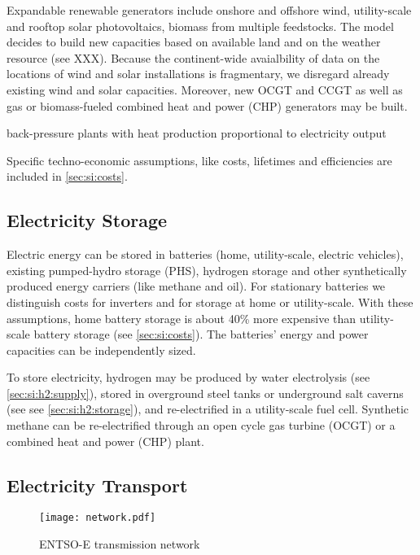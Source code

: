 Expandable renewable generators include onshore and offshore wind, utility-scale
and rooftop solar photovoltaics, biomass from multiple feedstocks. The model
decides to build new capacities based on available land and on the weather
resource (see XXX). Because the continent-wide avaialbility of data on the
locations of wind and solar installations is fragmentary, we disregard already
existing wind and solar capacities. Moreover, new OCGT and CCGT as well as gas or biomass-fueled combined heat and power (CHP) generators may be built.

back-pressure plants with heat production proportional to electricity output

Specific techno-economic assumptions, like costs, lifetimes and efficiencies are
included in \cref{sec:si:costs}.

\subsection{Electricity Storage}
\label{sec:si:electricity:storage}

Electric energy can be stored in batteries (home, utility-scale, electric
vehicles), existing pumped-hydro storage (PHS), hydrogen storage and other
synthetically produced energy carriers (like methane and oil). For stationary
batteries we distinguish costs for inverters and for storage at home or
utility-scale. With these assumptions, home battery storage is about 40\% more
expensive than utility-scale battery storage (see \cref{sec:si:costs}). The
batteries' energy and power capacities can be independently sized.

To store electricity, hydrogen may be produced by water electrolysis (see \cref{sec:si:h2:supply}),
stored in overground steel tanks or underground salt caverns (see see \cref{sec:si:h2:storage}), and
re-electrified in a utility-scale fuel cell. Synthetic methane can be
re-electrified through an open cycle gas turbine (OCGT) or a combined heat and
power (CHP) plant.

\subsection{Electricity Transport}
\label{sec:si:electricity:transport}

\begin{figure}
    \texttt{[image: network.pdf]}
    \label{fig:base-network}
    \caption{ENTSO-E transmission network}
\end{figure}

